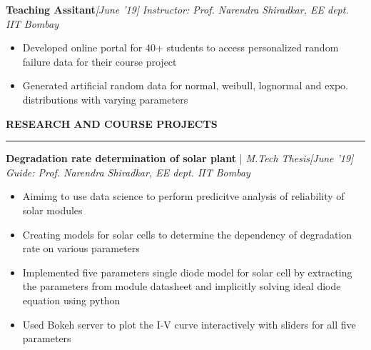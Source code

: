 \documentclass[10 pt]{article}%
\begin{document}
{{\flushleft \bf {\large{Teaching Assitant}}}\hfill {{{\em{[June '19]}}}}
\vspace{-0.8em}
{\flushleft \em{Instructor: Prof. Narendra Shiradkar, EE dept. IIT Bombay}}
\vspace{-5pt}
\begin{itemize}[leftmargin=*]
	\setlength\itemsep{1.5pt}
	\setlength\parskip{1.5pt}
	\item Developed online portal for 40+ students to access personalized random failure data for their course project%
	\item Generated artificial random data for normal, weibull, lognormal and expo. distributions with varying parameters
\end{itemize}
\begin{flushleft}\bf{\Large{RESEARCH AND COURSE PROJECTS}}\end{flushleft}
\vspace{-1mm}
\hrule
\vspace{1 pt}
{\flushleft \textbf {\large{Degradation rate determination of solar plant}} |\em{ M.Tech Thesis}}\hfill {{{\em{[June '19]}}}}
\vspace{-0.8em}
{\flushleft \em{Guide: Prof. Narendra Shiradkar, EE dept. IIT Bombay}}
\vspace{-5pt}
\begin{itemize}[leftmargin=*]
	\setlength\itemsep{1.5pt}
	\setlength\parskip{1.5pt}
	\item Aimimg to use data science to perform predicitve analysis of reliability of solar modules
	\item Creating models for solar cells to determine the dependency of degradation rate on various parameters
	\item Implemented five parameters single diode model for solar cell by extracting the parameters from module datasheet and implicitly solving ideal diode equation using python
	\item Used Bokeh server to plot the I-V curve interactively with sliders for all five parameters

\end{itemize}}
\end{document}
